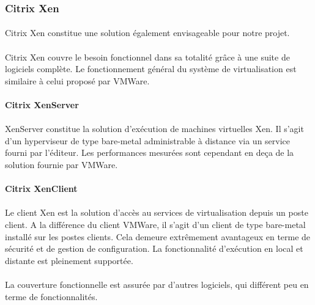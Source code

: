 \subsubsection{Citrix Xen}


\paragraph{} Citrix Xen constitue une solution également envisageable pour notre
projet.

\paragraph{} Citrix Xen couvre le besoin fonctionnel dans sa totalité grâce à
une suite de logiciels complète. Le fonctionnement général du système de
virtualisation est similaire à celui proposé par VMWare.

\paragraph{Citrix XenServer}

\paragraph{} XenServer constitue la solution d'exécution de machines virtuelles
Xen. Il s'agit d'un hyperviseur de type bare-metal administrable à distance via
un service fourni par l'éditeur. Les performances mesurées sont cependant en
deça de la solution fournie par VMWare.

\paragraph{Citrix XenClient}

\paragraph{} Le client Xen est la solution d'accès au services de virtualisation
depuis un poste client. A la différence du client VMWare, il s'agit d'un client
de type bare-metal installé sur les postes clients. Cela demeure extrêmement
avantageux en terme de sécurité et de gestion de configuration. La
fonctionnalité d'exécution en local et distante est pleinement supportée.

\paragraph{} La couverture fonctionnelle est assurée par d'autres logiciels, qui
différent peu en terme de fonctionnalités.

